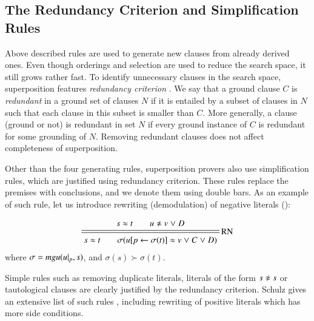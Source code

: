 
\medskip

\subsection{The Redundancy Criterion and Simplification Rules}

Above described rules are used to generate new clauses from already derived
ones. Even though orderings and selection are used to reduce the search space,
it still grows rather fast. To identify unnecessary clauses in the search
space, superposition features \emph{redundancy criterion}
\cite[Sect.~4.2.2]{bg-01-resolution}. We say that a ground clause $C$ is
{\em redundant} in a ground set of clauses $N$ if it is entailed by a subset of
clauses in $N$ such that each clause in this subset is smaller than $C$. More
generally, a clause (ground or not) is redundant in set $N$ if every ground
instance of $C$ is redundant for some grounding of $N$. Removing redundant
clauses does not affect completeness of superposition.

Other than the four generating rules, superposition provers also use
simplification rules, which are justified using redundancy criterion. These
rules replace the premises with conclusions, and we denote them using double
bars. As an example of such rule, let us introduce rewriting (demodulation) of
negative literals ():

\[
\namedsimp{RN}{s \eq t \qquad u \noteq v \llor D}
              {s \eq t \qquad \sigmacl{u[p \leftarrow \sigma(t)] \eq v \llor C \llor D}}
\]
where $\sigma = \mathit{mgu}(u|_p, s)$, and $\sigma(s) \succ \sigma(t)$.


Simple rules such as removing duplicate literals, literals of the form $s \noteq
s$ or tautological clauses are clearly justified by the redundancy criterion.
Schulz gives an extensive list of such rules \cite{ss-02-brainiac}, including rewriting of positive
literals which has more side conditions.

